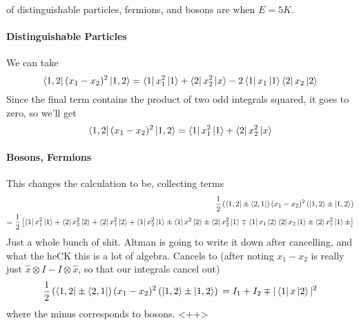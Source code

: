 \documentclass{article}
\theoremstyle{definition}
\begin{document}
of distinguishable particles, fermions, and bosons are when $E=5K$. \paragraph{Distinguishable Particles} We can take \begin{equation} \bra{1,2}(x_1-x_2)^2\ket{1,2}=\bra{1}x_1^2\ket{1}+\bra{2}x_2^2\ket{x}-2\bra{1}x_1\ket{1}\bra{2}x_2\ket{2} \end{equation} Since the final term contains the product of two odd integrals squared, it goes to zero, so we'll get \begin{equation} \bra{1,2}(x_1-x_2)^2\ket{1,2}=\bra{1}x_1^2\ket{1}+\bra{2}x_2^2\ket{x} \end{equation} \paragraph{Bosons, Fermions} This changes the calculation to be, collecting terms \begin{align} \frac{1}{2}\left(\bra{1,2}\pm\bra{2,1}\right)(x_1-x_2)^2\left(\ket{1,2}\pm\ket{1,2}\right)\\ = \frac{1}{2}\left[ \bra{1}x_1^2\ket{1}+\bra{2}x_2^2\ket{2}+\bra{2}x_1^2\ket{2}+\bra{1}x_2^2\ket{1}\pm\bra{1}x^2\ket{2}\pm\bra{2}x_2^2\ket{1}\mp\bra{1}x_1\ket{2}\bra{2}x_2\ket{1}\pm\bra{2}x_1^2\ket{1}\pm \right] \end{align} Just a whole bunch of shit. Altman is going to write it down after cancelling, and what the heCK this is a lot of algebra. Cancels to (after noting $x_1-x_2$ is really just $\hat x\otimes I-I\otimes\hat x$, so that our integrals cancel out) \begin{equation} \frac{1}{2}\left(\bra{1,2}\pm\bra{2,1}\right)(x_1-x_2)^2\left(\ket{1,2}\pm\ket{1,2}\right)\\=I_1+I_2\mp|\bra{1}x\ket{2}|^2 \end{equation} where the minus corresponds to bosons. <++>
\end{document}
